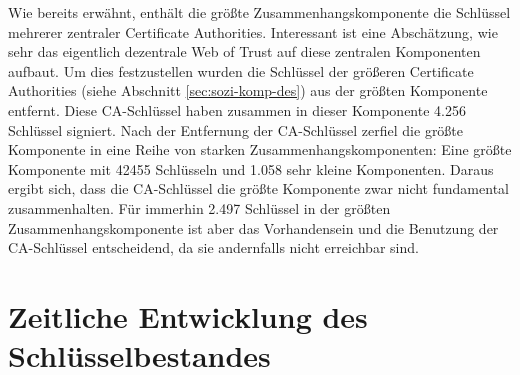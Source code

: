 Wie bereits erwähnt, enthält die größte Zusammenhangskomponente
die Schlüssel mehrerer zentraler Certificate
Authorities. Interessant ist eine Abschätzung, wie sehr das
eigentlich dezentrale Web of Trust auf diese zentralen Komponenten
aufbaut. Um dies festzustellen wurden die Schlüssel der größeren
Certificate Authorities (siehe Abschnitt \ref{sec:sozi-komp-des}) aus
der größten Komponente entfernt. Diese CA-Schlüssel haben
zusammen in dieser Komponente 4.256 Schlüssel signiert. Nach der
Entfernung der CA-Schlüssel zerfiel die größte Komponente in eine
Reihe von starken Zusammenhangskomponenten: Eine größte Komponente
mit 42455 Schlüsseln und 1.058 sehr kleine Komponenten. Daraus ergibt
sich, dass die CA-Schlüssel die größte Komponente zwar nicht
fundamental zusammenhalten. Für immerhin 2.497 Schlüssel in der
größten Zusammenhangskomponente ist aber das Vorhandensein und die
Benutzung der CA-Schlüssel entscheidend, da sie andernfalls nicht
erreichbar sind.

\section{Zeitliche Entwicklung des Schlüsselbestandes}
\label{sec:result-key-properties}

